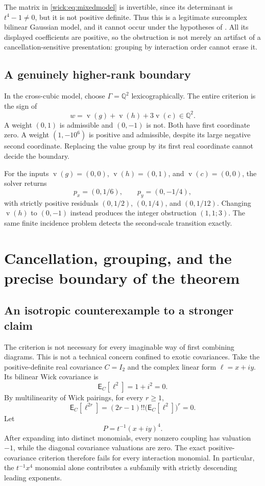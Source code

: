 \documentclass[11pt,letterpaper]{article}
\numberwithin{equation}{section}
\theoremstyle{definition}
\theoremstyle{remark}
\newcommand{\Q}{\mathbb Q}
\newcommand{\EE}{\mathsf E}
\newcommand{\val}{\operatorname v}
\begin{document}
The matrix in \eqref{wick:eq:mixedmodel} is invertible, since its determinant is
$t^4-1\ne0$, but it is not positive definite. Thus this is a legitimate
surcomplex bilinear Gaussian model, and it cannot occur under the hypotheses
of . All its displayed coefficients are positive, so the
obstruction is not merely an artifact of a cancellation-sensitive
presentation: grouping by interaction order cannot erase it.

\subsection{A genuinely higher-rank boundary}
\label{wick:sub:rankboundary}

In the cross-cubic model, choose $\Gamma=\Q^2$ lexicographically. The entire
criterion is the sign of
\[
 w=\val(g)+\val(h)+3\val(c)\in\Q^2.
\]
A weight $(0,1)$ is admissible and $(0,-1)$ is not. Both have first coordinate
zero. A weight $(1,-10^6)$ is positive and admissible, despite its large
negative second coordinate. Replacing the value group by its first real
coordinate cannot decide the boundary.

For the inputs $\val(g)=(0,0)$, $\val(h)=(0,1)$, and $\val(c)=(0,0)$,
the solver returns
\[
 p_x=(0,1/6),\qquad p_y=(0,-1/4),
\]
with strictly positive residuals $(0,1/2)$, $(0,1/4)$, and $(0,1/12)$.
Changing $\val(h)$ to $(0,-1)$ instead produces the integer obstruction
$(1,1;3)$. The same finite incidence problem detects the second-scale
transition exactly.

\section{Cancellation, grouping, and the precise boundary of the theorem}
\label{wick:sec:cancellation}

\subsection{An isotropic counterexample to a stronger claim}

The criterion is not necessary for every imaginable way of first combining
diagrams. This is not a technical concern confined to exotic covariances.
Take the positive-definite real covariance $C=I_2$ and the complex linear
form $\ell=x+iy$. Its bilinear Wick covariance is
\[
 \EE_C[\ell^2]=1+i^2=0.
\]
By multilinearity of Wick pairings, for every $r\ge1$,
\begin{equation}
 \EE_C[\ell^{2r}]=(2r-1)!!\bigl(\EE_C[\ell^2]\bigr)^r=0.
 \label{wick:eq:isotropicmoments}
\end{equation}
Let
\begin{equation}
 P=t^{-1}(x+iy)^4.
 \label{wick:eq:isotropicP}
\end{equation}
After expanding into distinct monomials, every nonzero coupling has valuation
$-1$, while the diagonal covariance valuations are zero. The exact
positive-covariance criterion therefore fails for every interaction
monomial. In particular, the $t^{-1}x^4$ monomial alone contributes a
subfamily with strictly descending leading exponents.
\end{document}
